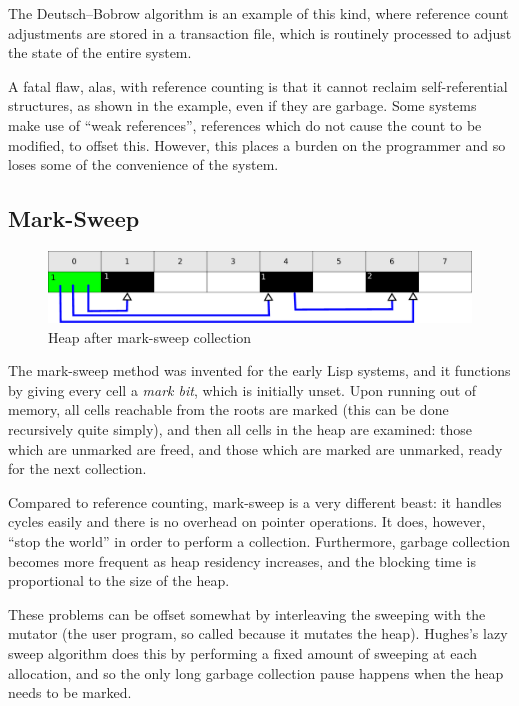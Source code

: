 The Deutsch--Bobrow algorithm is an example of this kind, where
reference count adjustments are stored in a transaction file, which is
routinely processed to adjust the state of the entire
system\cite{Deutsch76}.

A fatal flaw, alas, with reference counting is that it cannot reclaim
self-referential structures, as shown in the example, even if they are
garbage\cite{McBeth63}. Some systems make use of ``\glspl{weak
  reference}'', references which do not cause the count to be
modified, to offset this. However, this places a burden on
the programmer and so loses some of the convenience of the system.

\subsection{Mark-Sweep}
\label{sec:lit-gc-marksweep}

\begin{figure}[h]
  \centering
  \includegraphics[width=\textwidth]{lit-gc-marksweep}
  \caption{Heap after mark-sweep collection}
  \label{fig:lit-gc-marksweep}
\end{figure}

The mark-sweep method was invented for the early Lisp
systems\cite{McCarthy60}, and it functions by giving every cell a
\textit{mark bit}, which is initially unset. Upon running out of
memory, all cells reachable from the roots are marked (this can be
done recursively quite simply), and then all cells in the heap are
examined: those which are unmarked are freed, and those which are
marked are unmarked, ready for the next collection.

Compared to reference counting, mark-sweep is a very different beast:
it handles cycles easily and there is no overhead on pointer
operations. It does, however, ``stop the world'' in order to perform a
collection\cite{GarbageCollection}. Furthermore, garbage collection
becomes more frequent as heap residency increases, and the
blocking time is proportional to the size of the heap.

These problems can be offset somewhat by interleaving the sweeping
with the mutator (the user program, so called because it mutates the
heap). Hughes's lazy sweep algorithm\cite{Hughes82} does
this by performing a fixed amount of sweeping at each allocation, and
so the only long garbage collection pause happens when the heap needs
to be marked.

